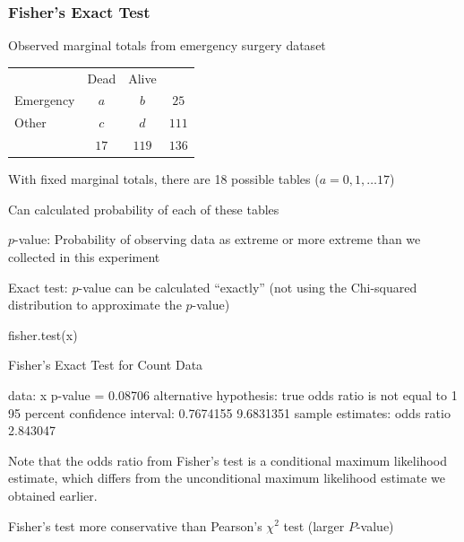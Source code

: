 \subsubsection{Fisher's Exact Test}

Observed marginal totals from emergency surgery dataset \\
\begin{tabular}{l|c|c|c} 
\multicolumn{1}{l}{} & \multicolumn{1}{c}{Dead} & \multicolumn{1}{l}{Alive} \\ \cline{2-3}
Emergency & $a$ & $b$ & $25$ \\ \cline{2-3}
Other & $c$ & $d$ &  $111$ \\ \cline{2-3}
\multicolumn{1}{l}{} & \multicolumn{1}{c}{$17$} & \multicolumn{1}{c}{$119$} & \multicolumn{1}{c}{$136$}
\end{tabular}

\bi
\item With fixed marginal totals, there are 18 possible tables ($a = 0, 1, \ldots 17$)
\item Can calculated probability of each of these tables
\bi
\item $p$-value: Probability of observing data as extreme or more extreme than we collected in this experiment
\ei
\item Exact test: $p$-value can be calculated ``exactly'' (not using the Chi-squared distribution to approximate the $p$-value)
\\
\begin{Schunk}
\begin{Sinput}
fisher.test(x)
\end{Sinput}
\begin{Soutput}

	Fisher's Exact Test for Count Data

data:  x
p-value = 0.08706
alternative hypothesis: true odds ratio is not equal to 1
95 percent confidence interval:
 0.7674155 9.6831351
sample estimates:
odds ratio 
  2.843047 
\end{Soutput}
\end{Schunk}
Note that the odds ratio from Fisher's test is a conditional maximum
likelihood estimate, which differs from the unconditional maximum
likelihood estimate we obtained earlier.
\item Fisher's test more conservative than Pearson's $\chi^2$ test
  (larger $P$-value) 
\ei

